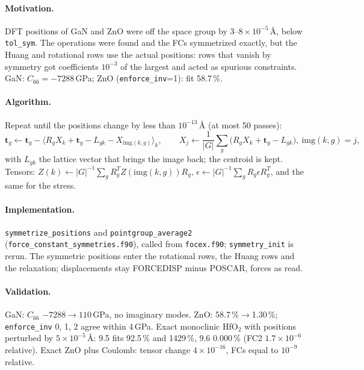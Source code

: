 \documentclass[11pt,a4paper]{article}
\newcommand{\bt}{\mathbf t}
\newcommand{\code}[1]{\texttt{#1}}
\begin{document}
\paragraph{Motivation.} DFT positions of GaN and ZnO were off the space group by $3$--$8\times10^{-5}$\,\AA,
below \code{tol\_sym}. The operations were found and the FCs symmetrized exactly, but the Huang and
rotational rows use the actual positions: rows that vanish by symmetry got coefficients $10^{-3}$ of the
largest and acted as spurious constraints. GaN: $C_{66}=-7288$\,GPa; ZnO (\code{enforce\_inv}=1): fit 58.7\,\%.

\paragraph{Algorithm.} Repeat until the positions change by less than $10^{-13}$\,\AA{} (at most 50 passes):
\begin{equation}
\bt_g\leftarrow\bt_g-\big\langle R_gX_k+\bt_g-L_{gk}-X_{\mathrm{img}(k,g)}\big\rangle_k,\qquad
X_j\leftarrow\frac1{|G|}\sum_g\big(R_gX_k+\bt_g-L_{gk}\big),\ \mathrm{img}(k,g)=j ,
\end{equation}
with $L_{gk}$ the lattice vector that brings the image back; the centroid is kept. Tensors:
$Z(k)\leftarrow|G|^{-1}\sum_gR_g^TZ(\mathrm{img}(k,g))R_g$, $\epsilon\leftarrow|G|^{-1}\sum_gR_g\epsilon R_g^T$, and the
same for the stress.

\paragraph{Implementation.} \code{symmetrize\_positions} and \code{pointgroup\_average2}
(\code{force\_constant\_symmetries.f90}), called from \code{focex.f90}; \code{symmetry\_init} is rerun. The
symmetric positions enter the rotational rows, the Huang rows and the relaxation; displacements stay
FORCEDISP minus POSCAR, forces as read.

\paragraph{Validation.} GaN: $C_{66}$ $-7288\to110$\,GPa, no imaginary modes. ZnO: 58.7\,\%$\to$1.30\,\%;
\code{enforce\_inv} 0, 1, 2 agree within 4\,GPa. Exact monoclinic HfO$_2$ with positions perturbed by
$5\times10^{-5}$\,\AA: 9.5 fits 92.5\,\% and 1429\,\%, 9.6 0.000\,\% (FC2 $1.7\times10^{-6}$ relative). Exact ZnO
plus Coulomb: tensor change $4\times10^{-16}$, FCs equal to $10^{-9}$ relative.
\end{document}
